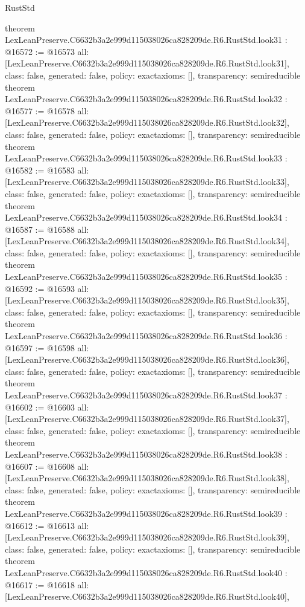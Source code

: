 \begin{lexlean}{RustStd}
\begin{coremodule}
{}
theorem LexLeanPreserve.C6632b3a2e999d115038026ca828209de.R6.RustStd.look31 : @16572 := @16573 {
  all: [LexLeanPreserve.C6632b3a2e999d115038026ca828209de.R6.RustStd.look31],
  class: false,
  generated: false,
  policy: exact{axioms: []},
  transparency: semireducible
}
theorem LexLeanPreserve.C6632b3a2e999d115038026ca828209de.R6.RustStd.look32 : @16577 := @16578 {
  all: [LexLeanPreserve.C6632b3a2e999d115038026ca828209de.R6.RustStd.look32],
  class: false,
  generated: false,
  policy: exact{axioms: []},
  transparency: semireducible
}
theorem LexLeanPreserve.C6632b3a2e999d115038026ca828209de.R6.RustStd.look33 : @16582 := @16583 {
  all: [LexLeanPreserve.C6632b3a2e999d115038026ca828209de.R6.RustStd.look33],
  class: false,
  generated: false,
  policy: exact{axioms: []},
  transparency: semireducible
}
theorem LexLeanPreserve.C6632b3a2e999d115038026ca828209de.R6.RustStd.look34 : @16587 := @16588 {
  all: [LexLeanPreserve.C6632b3a2e999d115038026ca828209de.R6.RustStd.look34],
  class: false,
  generated: false,
  policy: exact{axioms: []},
  transparency: semireducible
}
theorem LexLeanPreserve.C6632b3a2e999d115038026ca828209de.R6.RustStd.look35 : @16592 := @16593 {
  all: [LexLeanPreserve.C6632b3a2e999d115038026ca828209de.R6.RustStd.look35],
  class: false,
  generated: false,
  policy: exact{axioms: []},
  transparency: semireducible
}
theorem LexLeanPreserve.C6632b3a2e999d115038026ca828209de.R6.RustStd.look36 : @16597 := @16598 {
  all: [LexLeanPreserve.C6632b3a2e999d115038026ca828209de.R6.RustStd.look36],
  class: false,
  generated: false,
  policy: exact{axioms: []},
  transparency: semireducible
}
theorem LexLeanPreserve.C6632b3a2e999d115038026ca828209de.R6.RustStd.look37 : @16602 := @16603 {
  all: [LexLeanPreserve.C6632b3a2e999d115038026ca828209de.R6.RustStd.look37],
  class: false,
  generated: false,
  policy: exact{axioms: []},
  transparency: semireducible
}
theorem LexLeanPreserve.C6632b3a2e999d115038026ca828209de.R6.RustStd.look38 : @16607 := @16608 {
  all: [LexLeanPreserve.C6632b3a2e999d115038026ca828209de.R6.RustStd.look38],
  class: false,
  generated: false,
  policy: exact{axioms: []},
  transparency: semireducible
}
theorem LexLeanPreserve.C6632b3a2e999d115038026ca828209de.R6.RustStd.look39 : @16612 := @16613 {
  all: [LexLeanPreserve.C6632b3a2e999d115038026ca828209de.R6.RustStd.look39],
  class: false,
  generated: false,
  policy: exact{axioms: []},
  transparency: semireducible
}
theorem LexLeanPreserve.C6632b3a2e999d115038026ca828209de.R6.RustStd.look40 : @16617 := @16618 {
  all: [LexLeanPreserve.C6632b3a2e999d115038026ca828209de.R6.RustStd.look40],
}
\end{coremodule}
\end{lexlean}
